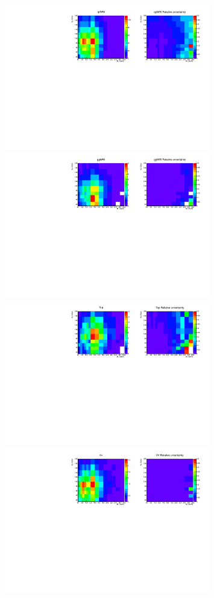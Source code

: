 \begin{figure}[htp]
\centering
\includegraphics[width=0.8\textwidth]{figures/2dtemplate_qqWW_mH125_0j.pdf}
\includegraphics[width=0.8\textwidth]{figures/2dtemplate_ggWW_mH125_0j.pdf}
\includegraphics[width=0.8\textwidth]{figures/2dtemplate_Top_mH125_0j.pdf}
\includegraphics[width=0.8\textwidth]{figures/2dtemplate_VV_mH125_0j.pdf}

\end{figure}
